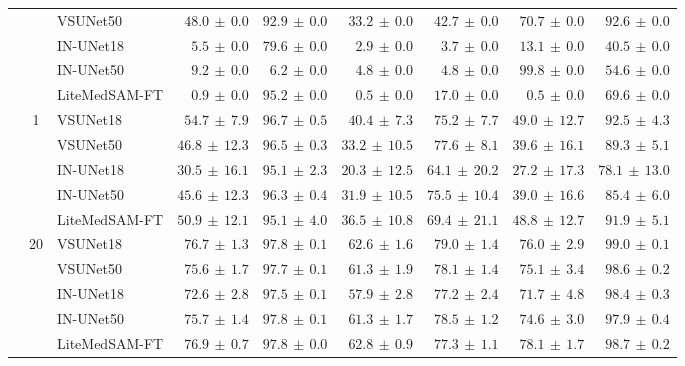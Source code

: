 \documentclass[twocolumn]{article}
\begin{document}
\begin{table}[t]
\begin{tabular}{l c l r r r r r r}
 &  & VSUNet50 & $48.0 \,\pm\, 0.0$ & $92.9 \,\pm\, 0.0$ & $33.2 \,\pm\, 0.0$ & $42.7 \,\pm\, 0.0$ & $70.7 \,\pm\, 0.0$ & $92.6 \,\pm\, 0.0$ \\
 &  & IN-UNet18 & $5.5 \,\pm\, 0.0$ & $79.6 \,\pm\, 0.0$ & $2.9 \,\pm\, 0.0$ & $3.7 \,\pm\, 0.0$ & $13.1 \,\pm\, 0.0$ & $40.5 \,\pm\, 0.0$ \\
 &  & IN-UNet50 & $9.2 \,\pm\, 0.0$ & $6.2 \,\pm\, 0.0$ & $4.8 \,\pm\, 0.0$ & $4.8 \,\pm\, 0.0$ & $99.8 \,\pm\, 0.0$ & $54.6 \,\pm\, 0.0$ \\
 &  & LiteMedSAM-FT & $0.9 \,\pm\, 0.0$ & $95.2 \,\pm\, 0.0$ & $0.5 \,\pm\, 0.0$ & $17.0 \,\pm\, 0.0$ & $0.5 \,\pm\, 0.0$ & $69.6 \,\pm\, 0.0$ \\
\cline{2-9}
 & \multirow{5}{*}{1} & VSUNet18 & $\mathbf{54.7} \,\pm\, 7.9$ & $96.7 \,\pm\, 0.5$ & $40.4 \,\pm\, 7.3$ & $75.2 \,\pm\, 7.7$ & $49.0 \,\pm\, 12.7$ & $92.5 \,\pm\, 4.3$ \\
 &  & VSUNet50 & $46.8 \,\pm\, 12.3$ & $96.5 \,\pm\, 0.3$ & $33.2 \,\pm\, 10.5$ & $77.6 \,\pm\, 8.1$ & $39.6 \,\pm\, 16.1$ & $89.3 \,\pm\, 5.1$ \\
 &  & IN-UNet18 & $30.5 \,\pm\, 16.1$ & $95.1 \,\pm\, 2.3$ & $20.3 \,\pm\, 12.5$ & $64.1 \,\pm\, 20.2$ & $27.2 \,\pm\, 17.3$ & $78.1 \,\pm\, 13.0$ \\
 &  & IN-UNet50 & $45.6 \,\pm\, 12.3$ & $96.3 \,\pm\, 0.4$ & $31.9 \,\pm\, 10.5$ & $75.5 \,\pm\, 10.4$ & $39.0 \,\pm\, 16.6$ & $85.4 \,\pm\, 6.0$ \\
 &  & LiteMedSAM-FT & $50.9 \,\pm\, 12.1$ & $95.1 \,\pm\, 4.0$ & $36.5 \,\pm\, 10.8$ & $69.4 \,\pm\, 21.1$ & $48.8 \,\pm\, 12.7$ & $91.9 \,\pm\, 5.1$ \\
\cline{2-9}
 & \multirow{7}{*}{20} & VSUNet18 & $76.7 \,\pm\, 1.3$ & $97.8 \,\pm\, 0.1$ & $62.6 \,\pm\, 1.6$ & $79.0 \,\pm\, 1.4$ & $76.0 \,\pm\, 2.9$ & $99.0 \,\pm\, 0.1$ \\
 &  & VSUNet50 & $75.6 \,\pm\, 1.7$ & $97.7 \,\pm\, 0.1$ & $61.3 \,\pm\, 1.9$ & $78.1 \,\pm\, 1.4$ & $75.1 \,\pm\, 3.4$ & $98.6 \,\pm\, 0.2$ \\
 &  & IN-UNet18 & $72.6 \,\pm\, 2.8$ & $97.5 \,\pm\, 0.1$ & $57.9 \,\pm\, 2.8$ & $77.2 \,\pm\, 2.4$ & $71.7 \,\pm\, 4.8$ & $98.4 \,\pm\, 0.3$ \\
 &  & IN-UNet50 & $75.7 \,\pm\, 1.4$ & $97.8 \,\pm\, 0.1$ & $61.3 \,\pm\, 1.7$ & $78.5 \,\pm\, 1.2$ & $74.6 \,\pm\, 3.0$ & $97.9 \,\pm\, 0.4$ \\
 &  & LiteMedSAM-FT & $\mathbf{76.9} \,\pm\, 0.7$ & $97.8 \,\pm\, 0.0$ & $62.8 \,\pm\, 0.9$ & $77.3 \,\pm\, 1.1$ & $78.1 \,\pm\, 1.7$ & $98.7 \,\pm\, 0.2$ \\

\end{tabular}
\end{table}
\end{document}
